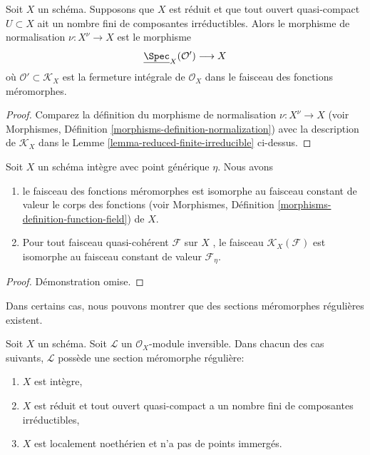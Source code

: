 \begin{lemma}
\label{lemma-reduced-normalization}
Soit  $X$  un schéma. Supposons que  $X$  est réduit et que tout
ouvert quasi-compact  $U \subset X$  ait un nombre fini de composantes irréductibles.
Alors le morphisme de normalisation  $\nu : X^\nu \to X$  est le morphisme
$$
\underline{\Spec}_X(\mathcal{O}') \longrightarrow X
$$
où  $\mathcal{O}' \subset \mathcal{K}_X$  est la fermeture intégrale de  $\mathcal{O}_X$  dans le faisceau des
fonctions méromorphes.
\end{lemma}

\begin{proof}
Comparez la définition du morphisme de normalisation  $\nu : X^\nu \to X$  (voir
Morphismes, Définition  \ref{morphisms-definition-normalization}) avec la description de  $\mathcal{K}_X$  dans le
Lemme  \ref{lemma-reduced-finite-irreducible}  ci-dessus.
\end{proof}

\begin{lemma}
\label{lemma-meromorphic-functions-integral-scheme}
Soit  $X$  un schéma intègre avec point générique  $\eta$. Nous avons
\begin{enumerate}
\item le faisceau des fonctions méromorphes est isomorphe au faisceau constant de valeur
le corps des fonctions (voir Morphismes, Définition  \ref{morphisms-definition-function-field}) de  $X$.
\item Pour tout faisceau quasi-cohérent  $\mathcal{F}$  sur  $X$ , le faisceau
 $\mathcal{K}_X(\mathcal{F})$  est isomorphe au faisceau constant de valeur  $\mathcal{F}_\eta$.
\end{enumerate}
\end{lemma}

\begin{proof}
Démonstration omise.
\end{proof}

\noindent
Dans certains cas, nous pouvons montrer que des sections méromorphes régulières
existent.

\begin{lemma}
\label{lemma-regular-meromorphic-section-exists}
Soit  $X$  un schéma. Soit  $\mathcal{L}$  un  $\mathcal{O}_X$-module inversible.
Dans chacun des cas suivants,  $\mathcal{L}$  possède une section méromorphe
régulière:
\begin{enumerate}
\item $X$  est intègre,
\item $X$  est réduit et tout ouvert quasi-compact a un nombre fini de
composantes irréductibles,
\item $X$  est localement noethérien et n’a pas de points immergés.
\end{enumerate}
\end{lemma}

